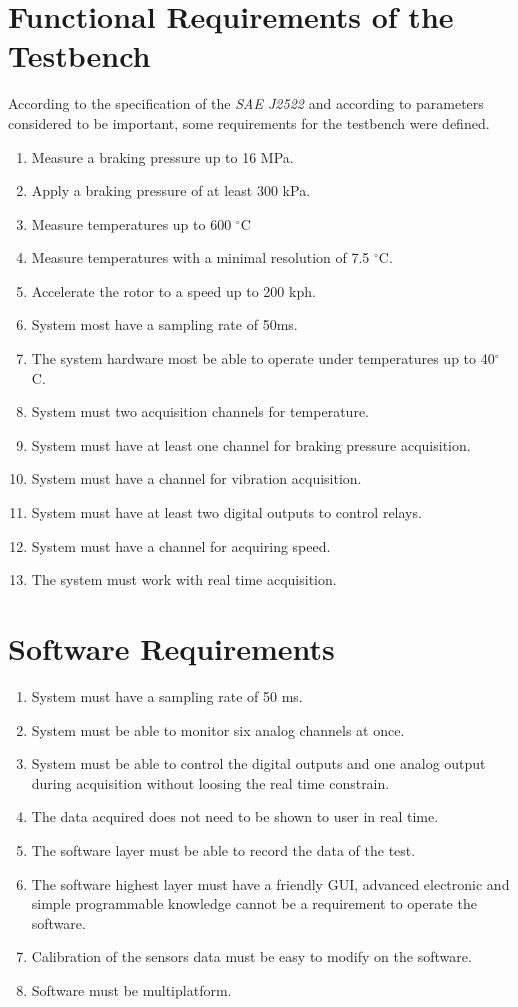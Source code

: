 \section{Functional Requirements of the Testbench}

	According to the specification of the \textit{SAE J2522} and according to parameters considered to be important, some requirements for the testbench were defined.

	\begin{enumerate}
		\item Measure a braking pressure up to 16 MPa.
		\item Apply a braking pressure of at least 300 kPa.
		\item Measure temperatures up to 600 $^{\circ}$C
		\item Measure temperatures with a minimal resolution of 7.5 $^{\circ}$C.
		\item Accelerate the rotor to a speed up to 200 kph.
		\item System most have a sampling rate of 50ms.
		\item The system hardware most be able to operate under temperatures up to 40$^{\circ}$C.
		\item System must two acquisition channels for temperature.
		\item System must have at least one channel for braking pressure acquisition.
		\item System must have a channel for vibration acquisition.
		\item System must have at least two digital outputs to control relays.
		\item System must have a channel for acquiring speed.
		\item The system must work with real time acquisition.
	\end{enumerate}
	
\section{Software Requirements}
	
	\begin{enumerate}
		\item System must have a sampling rate of 50 ms.
		\item System must be able to monitor six analog channels at once.
		\item System must be able to control the digital outputs and one analog output during acquisition without loosing the real time constrain.
		\item The data acquired does not need to be shown to user in real time.
		\item The software layer must be able to record the data of the test.
		\item The software highest layer must have a friendly GUI, advanced electronic and simple programmable knowledge cannot be a requirement to operate the software.
		\item Calibration of the sensors data must be easy to modify on the software.
		\item Software must be multiplatform.
	\end{enumerate}

